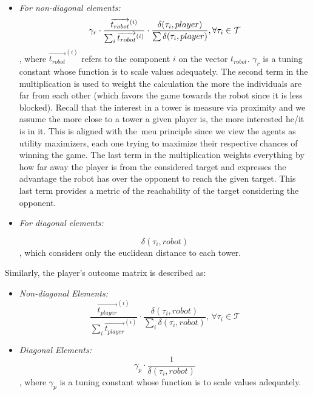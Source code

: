 \begin{itemize}
\item \textit{For non-diagonal elements:}\\

\begin{equation}
    \label{eq:Non-diagonal}
    \gamma_r \cdot \frac{\overrightarrow{t_{robot}}^{(i)}}{\sum_{i}{\overrightarrow{t_{robot}}^{(i)}}} \cdot \frac{\delta(\tau_{i},player)}{\sum{\delta(\tau_{i},player)}}, \forall\tau_{i} \in \mathcal{T}\\ 
\end{equation}
, where $\overrightarrow{t_{robot}}^{(i)}$ refers to the component $i$ on the vector $t_{robot}$. $\gamma_r$ is a tuning constant whose function is to scale values adequately. The second term in the multiplication is used to weight the calculation the more the individuals are far from each other (which favors the game towards the robot since it is less blocked). Recall that the interest in a tower is measure via proximity and we assume the more close to a tower a given player is, the more interested he/it is in it. This is aligned with the~\gls{meu} principle since we view the agents as utility maximizers, each one trying to maximize their respective chances of winning the game. The last term in the multiplication weights everything by how far away the player is from the considered target and expresses the advantage the robot has over the opponent to reach the given target. This last term provides a metric of the reachability of the target considering the opponent.

\item \textit{For diagonal elements:}

\begin{equation}
    \label{eq:Diagonal}
    \delta(\tau_{i},robot)
\end{equation}
, which considers only the euclidean distance to each tower.
\end{itemize}

Similarly, the player's outcome matrix is described as:
\begin{itemize}
    \item \textit{Non-diagonal Elements:}\\
        \begin{equation}
            \label{for:Non-DiagonalPlayer}
            \frac{\overrightarrow{t_{player}}^{(i)}}{\sum_{i}{\overrightarrow{t_{player}}^{(i)}}} \cdot \frac{\delta(\tau_{i},robot)}{\sum_{i}{\delta(\tau_{i},robot)}}, \, \forall\tau_{i} \in \mathcal{T} 
        \end{equation}
    \item \textit{Diagonal Elements:}
        \begin{equation}
            \label{for:DiagonalPlayer}
            \gamma_p \cdot \frac{1}{\delta(\tau_{i},robot)}
        \end{equation}
        , where $\gamma_p$ is a tuning constant whose function is to scale values adequately.
\end{itemize}

